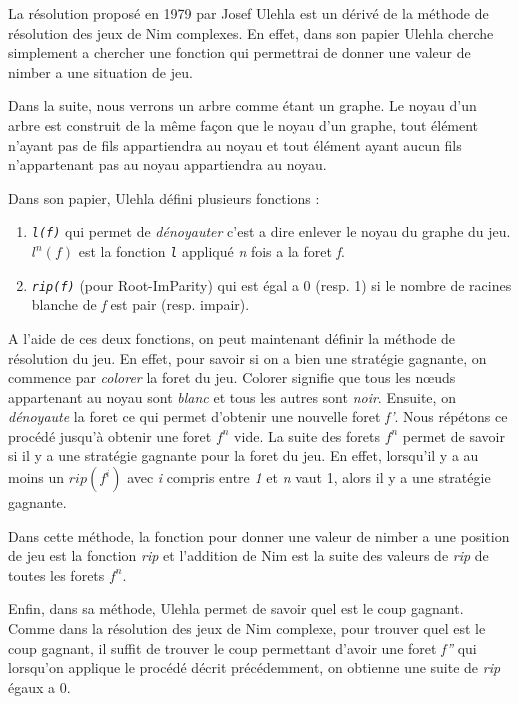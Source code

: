   La résolution proposé en 1979 par Josef Ulehla est un dérivé de la méthode de résolution des jeux de Nim complexes. En effet, dans son papier \cite{UleHack} Ulehla cherche simplement a chercher une fonction qui permettrai de donner une valeur de nimber a une situation de jeu.

  Dans la suite, nous verrons un arbre comme étant un graphe. Le noyau d'un arbre est construit de la même façon que le noyau d'un graphe, tout élément n'ayant pas de fils appartiendra au noyau et tout élément ayant aucun fils n'appartenant pas au noyau appartiendra au noyau.

  Dans son papier, Ulehla défini plusieurs fonctions :
  \begin{enumerate}
    \item \textit{\texttt{l(f)}} qui permet de \textit{dénoyauter} c'est a dire enlever le noyau du graphe du jeu. $l^n(f)$ est la fonction \textit{\texttt{l}} appliqué \textit{n} fois a la foret \textit{f}.
    \item\textit{\texttt{rip(f)}} (pour Root-ImParity) qui est égal a 0 (resp. 1) si le nombre de racines blanche de \textit{f} est pair (resp. impair).
  \end{enumerate}

  A l'aide de ces deux fonctions, on peut maintenant définir la méthode de résolution du jeu. En effet, pour savoir si on a bien une stratégie gagnante, on commence par \textit{colorer} la foret du jeu. Colorer signifie que tous les nœuds appartenant au noyau sont \textit{blanc} et tous les autres sont \textit{noir}. Ensuite, on \textit{dénoyaute} la foret ce qui permet d'obtenir une nouvelle foret \textit{f'}. Nous répétons ce procédé jusqu’à obtenir une foret $f^n$ vide. La suite des forets $f^n$ permet de savoir si il y a une stratégie gagnante pour la foret du jeu. En effet, lorsqu'il y a au moins un $rip(f^i)$ avec \textit{i} compris entre \textit{1} et \textit{n} vaut 1, alors il y a une stratégie gagnante.

  Dans cette méthode, la fonction pour donner une valeur de nimber a une position de jeu est la fonction \textit{rip} et l'addition de Nim est la suite des valeurs de \textit{rip} de toutes les forets $f^n$.

  Enfin, dans sa méthode, Ulehla permet de savoir quel est le coup gagnant. Comme dans la résolution des jeux de Nim complexe, pour trouver quel est le coup gagnant, il suffit de trouver le coup permettant d'avoir une foret \textit{f''} qui lorsqu'on applique le procédé décrit précédemment, on obtienne une suite de \textit{rip} égaux a 0.


